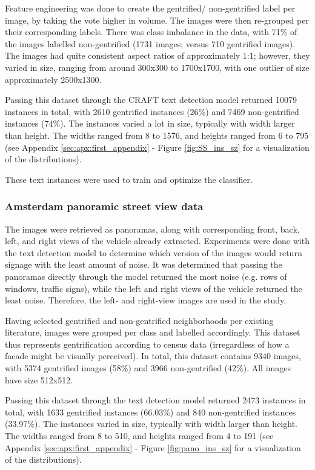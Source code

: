 Feature engineering was done to create the gentrified/ non-gentrified label per image, by taking the vote higher in volume. The images were then re-grouped per their corresponding labels. There was class imbalance in the data, with 71\% of the images labelled non-gentrified (1731 images; versus 710 gentrified images). The images had quite consistent aspect ratios of approximately 1:1; however, they varied in size, ranging from around 300x300 to 1700x1700, with one outlier of size approximately 2500x1300.

Passing this dataset through the CRAFT text detection model returned 10079 instances in total, with 2610 gentrified instances (26\%) and 7469 non-gentrified instances (74\%). The instances varied a lot in size, typically with width larger than height. The widths ranged from 8 to 1576, and heights ranged from 6 to 795 (see Appendix \ref{sec:apx:first_appendix} - Figure \ref{fig:SS_ins_sz} for a visualization of the distributions).

These text instances were used to train and optimize the classifier.

\subsubsection{Amsterdam panoramic street view data}
The images were retrieved as panoramas, along with corresponding front, back, left, and right views of the vehicle already extracted. Experiments were done with the text detection model to determine which version of the images would return signage with the least amount of noise. It was determined that passing the panoramas directly through the model returned the most noise (e.g. rows of windows, traffic signs), while the left and right views of the vehicle returned the least noise. Therefore, the left- and right-view images are used in the study.

Having selected gentrified and non-gentrified neighborhoods per existing literature, images were grouped per class and labelled accordingly. This dataset thus represents gentrification according to census data (irregardless of how a facade might be visually perceived). In total, this dataset contains 9340 images, with 5374 gentrified images (58\%) and 3966 non-gentrified (42\%). All images have size 512x512.

Passing this dataset through the text detection model returned 2473 instances in total, with 1633 gentrified instances (66.03\%) and 840 non-gentrified instances (33.97\%). The instances varied in size, typically with width larger than height. The widths ranged from 8 to 510, and heights ranged from 4 to 191 (see Appendix \ref{sec:apx:first_appendix} - Figure \ref{fig:pano_ins_sz} for a visualization of the distributions).

